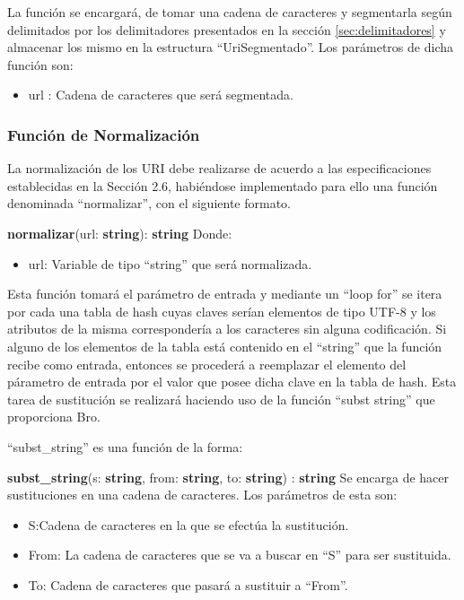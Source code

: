 La función se encargará, de tomar una cadena de caracteres y segmentarla según delimitados por los delimitadores presentados en la sección \ref{sec:delimitadores} y almacenar los mismo en la estructura ``UriSegmentado''.
Los parámetros de dicha función son:
\begin{itemize}
\item url : Cadena de caracteres que será segmentada.
\end{itemize}

\subsubsection{Función de Normalización}

La normalización de los URI debe realizarse de acuerdo a las especificaciones establecidas en la Sección 2.6, habiéndose implementado para ello una función denominada ``normalizar'', con el siguiente formato.

\textbf{normalizar}(url: \textbf{string}): \textbf{string} Donde:

\begin{itemize}
\item url: Variable de tipo ``string'' que será normalizada.
\end{itemize}

Esta función tomará el parámetro de entrada y mediante un ``loop for''
se itera por cada una tabla de hash cuyas claves serían elementos de tipo UTF-8 y los atributos de la misma correspondería a los caracteres sin alguna codificación. Si alguno de los elementos de la tabla está contenido en el ``string'' que la función recibe como entrada, entonces se procederá a reemplazar el elemento del párametro de entrada por el valor que posee dicha clave en la tabla de hash. Esta tarea de sustitución se realizará haciendo uso de la función ``subst string'' que proporciona Bro.

``subst\_string'' es una función de la forma:

\textbf{subst\_string}(s: \textbf{string}, from: \textbf{string}, to: \textbf{string}) : \textbf{string}
Se encarga de hacer sustituciones en una cadena de caracteres. Los
parámetros de esta son:

\begin{itemize}
\item S:Cadena de caracteres en la que se efectúa la sustitución.
\item From: La cadena de caracteres que se va a buscar en ``S'' para ser
sustituida.
\item To: Cadena de caracteres que pasará a sustituir a ``From''.
\end{itemize}


